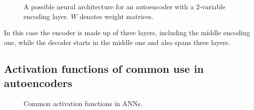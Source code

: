 \begin{figure}[ht!]
{  }
  \caption[Sample autoencoder]{A possible neural architecture for an autoencoder with a 2-variable encoding layer. $W$ denotes weight matrices.}
  \label{p1fig:ae-example}
\end{figure}

In this case the encoder is made up of three layers, including the middle encoding one, while the decoder starts in the middle one and also spans three layers. 

\subsection{Activation functions of common use in autoencoders}
\begin{figure}[htp!]
	\centering
  \hfill
  \hfill

  \hfill
  \hfill
	\caption{Common activation functions in ANNs.}
	\label{p1Fig.ActivationFunctions}
\end{figure}


